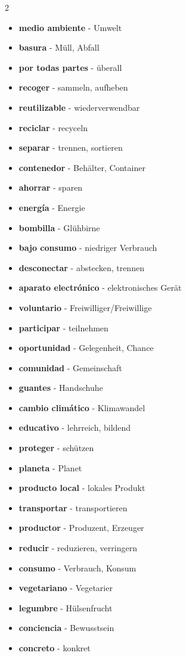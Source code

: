 \documentclass[12pt,a4paper]{article}
\begin{document}
\begin{multicols}{2}
\begin{itemize}[leftmargin=*]
    \item \textbf{medio ambiente} - Umwelt
    \item \textbf{basura} - Müll, Abfall
    \item \textbf{por todas partes} - überall
    \item \textbf{recoger} - sammeln, aufheben
    \item \textbf{reutilizable} - wiederverwendbar
    \item \textbf{reciclar} - recyceln
    \item \textbf{separar} - trennen, sortieren
    \item \textbf{contenedor} - Behälter, Container
    \item \textbf{ahorrar} - sparen
    \item \textbf{energía} - Energie
    \item \textbf{bombilla} - Glühbirne
    \item \textbf{bajo consumo} - niedriger Verbrauch
    \item \textbf{desconectar} - abstecken, trennen
    \item \textbf{aparato electrónico} - elektronisches Gerät
    \item \textbf{voluntario} - Freiwilliger/Freiwillige
    \item \textbf{participar} - teilnehmen
    \item \textbf{oportunidad} - Gelegenheit, Chance
    \item \textbf{comunidad} - Gemeinschaft
    \item \textbf{guantes} - Handschuhe
    \item \textbf{cambio climático} - Klimawandel
    \item \textbf{educativo} - lehrreich, bildend
    \item \textbf{proteger} - schützen
    \item \textbf{planeta} - Planet
    \item \textbf{producto local} - lokales Produkt
    \item \textbf{transportar} - transportieren
    \item \textbf{productor} - Produzent, Erzeuger
    \item \textbf{reducir} - reduzieren, verringern
    \item \textbf{consumo} - Verbrauch, Konsum
    \item \textbf{vegetariano} - Vegetarier
    \item \textbf{legumbre} - Hülsenfrucht
    \item \textbf{conciencia} - Bewusstsein
    \item \textbf{concreto} - konkret
\end{itemize}
\end{multicols}
\end{document}
